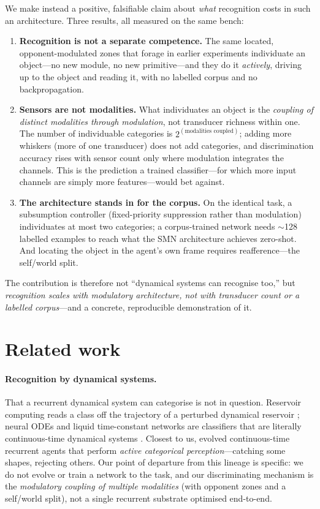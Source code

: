 \documentclass[11pt]{article}
\begin{document}
We make instead a positive, falsifiable claim about \emph{what} recognition
costs in such an architecture. Three results, all measured on the same bench:

\begin{enumerate}
\item \textbf{Recognition is not a separate competence.} The same located,
  opponent-modulated zones that forage in earlier experiments individuate an
  object---no new module, no new primitive---and they do it \emph{actively},
  driving up to the object and reading it, with no labelled corpus and no
  backpropagation.
\item \textbf{Sensors are not modalities.} What individuates an object is the
  \emph{coupling of distinct modalities through modulation}, not transducer
  richness within one. The number of individuable categories is
  $2^{(\text{modalities coupled})}$; adding more whiskers (more of one
  transducer) does not add categories, and discrimination accuracy rises with
  sensor count only where modulation integrates the channels. This is the
  prediction a trained classifier---for which more input channels are simply
  more features---would bet against.
\item \textbf{The architecture stands in for the corpus.} On the identical task,
  a subsumption controller (fixed-priority suppression rather than modulation)
  individuates at most two categories; a corpus-trained network needs
  $\sim$128 labelled examples to reach what the SMN architecture achieves
  zero-shot. And locating the object in the agent's own frame requires
  reafference---the self/world split.
\end{enumerate}

The contribution is therefore not ``dynamical systems can recognise too,'' but
\emph{recognition scales with modulatory architecture, not with transducer count
or a labelled corpus}---and a concrete, reproducible demonstration of it.

\section{Related work}

\paragraph{Recognition by dynamical systems.}
That a recurrent dynamical system can categorise is not in question. Reservoir
computing reads a class off the trajectory of a perturbed dynamical reservoir
\citep{Maass2002,JaegerHaas2004}; neural ODEs and liquid time-constant networks
are classifiers that are literally continuous-time dynamical systems
\citep{Chen2018NeuralODE,Hasani2021Liquid}. Closest to us,
\citet{Beer2003} evolved continuous-time recurrent agents that perform
\emph{active categorical perception}---catching some shapes, rejecting others.
Our point of departure from this lineage is specific: we do not evolve or train
a network to the task, and our discriminating mechanism is the \emph{modulatory
coupling of multiple modalities} (with opponent zones and a self/world split),
not a single recurrent substrate optimised end-to-end.
\end{document}
